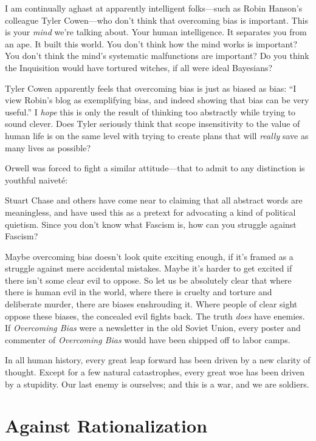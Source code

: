 {
 I am continually aghast at apparently intelligent folks---such as
Robin Hanson's colleague Tyler Cowen{}---who
don't think that overcoming bias is important. This is
your \textit{mind} we're talking about. Your human
intelligence. It separates you from an ape. It built this world. You
don't think how the mind works is important? You
don't think the mind's systematic
malfunctions are important? Do you think the Inquisition would have
tortured witches, if all were ideal Bayesians?}

{
 Tyler Cowen apparently feels that overcoming bias is just as
biased as bias: ``I view Robin's blog
as exemplifying bias, and indeed showing that bias can be very
useful.'' I \textit{hope} this is only the result of
thinking too abstractly while trying to sound clever. Does Tyler
seriously think that scope insensitivity to the value of human life is
on the same level with trying to create plans that will \textit{really}
save as many lives as possible?}

{
 Orwell was forced to fight a similar attitude---that to admit to
any distinction is youthful naiveté:}

{
 Stuart Chase and others have come near to claiming that all
abstract words are meaningless, and have used this as a pretext for
advocating a kind of political quietism. Since you
don't know what Fascism is, how can you struggle
against Fascism?}

{
 Maybe overcoming bias doesn't look quite exciting
enough, if it's framed as a struggle against mere
accidental mistakes. Maybe it's harder to get excited
if there isn't some clear evil to oppose. So let us be
absolutely clear that where there is human evil in the world, where
there is cruelty and torture and deliberate murder, there are biases
enshrouding it. Where people of clear sight oppose these biases, the
concealed evil fights back. The truth \textit{does} have enemies. If
\textit{Overcoming Bias} were a newsletter in the old Soviet Union,
every poster and commenter of \textit{Overcoming Bias} would have been
shipped off to labor camps.}

{
 In all human history, every great leap forward has been driven by
a new clarity of thought. Except for a few natural catastrophes, every
great woe has been driven by a stupidity. Our last enemy is ourselves;
and this is a war, and we are soldiers.}

\myendsectiontext


\bigskip


\chapter{Against Rationalization}

